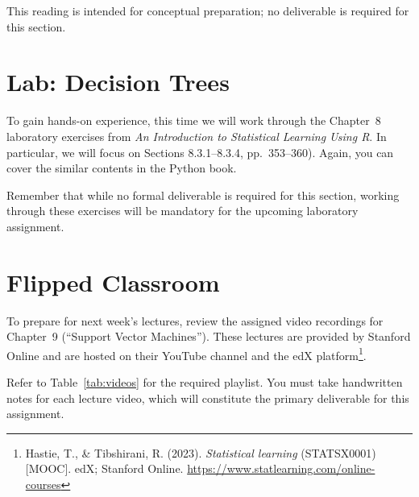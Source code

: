 \documentclass{article}
\begin{document}
\noindent This reading is intended for conceptual preparation; no deliverable is required for this section.

\section{Lab: Decision Trees}
\label{sec:lab}

To gain hands-on experience, this time we will work through the Chapter~8 laboratory exercises from \textit{An Introduction to Statistical Learning Using R}.  In particular, we will focus on Sections 8.3.1--8.3.4, pp.~353--360). Again, you can cover the similar contents in the Python book.

Remember that while no formal deliverable is required for this section, working through these exercises will be mandatory for the upcoming laboratory assignment.

\section{Flipped Classroom}
\label{sec:flipped}

To prepare for next week's lectures, review the assigned video recordings for Chapter~9 (``Support Vector Machines''). These lectures are provided by Stanford Online and are hosted on their YouTube channel and the edX platform\footnote{Hastie, T., \& Tibshirani, R. (2023). \textit{Statistical learning} (STATSX0001) [MOOC]. edX; Stanford Online. \url{https://www.statlearning.com/online-courses}}.

Refer to Table~\ref{tab:videos} for the required playlist. You must take handwritten notes for each lecture video, which will constitute the primary deliverable for this assignment.
\end{document}
